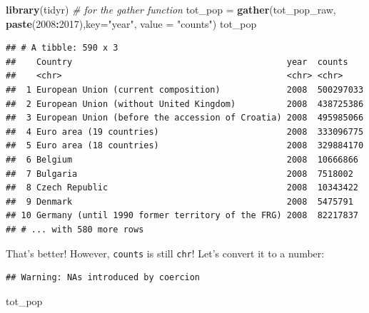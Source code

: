 \documentclass[]{book}
\newenvironment{Shaded}{\begin{snugshade}}{\end{snugshade}}
\newcommand{\KeywordTok}[1]{\textcolor[rgb]{0.13,0.29,0.53}{\textbf{#1}}}
\newcommand{\DataTypeTok}[1]{\textcolor[rgb]{0.13,0.29,0.53}{#1}}
\newcommand{\DecValTok}[1]{\textcolor[rgb]{0.00,0.00,0.81}{#1}}
\newcommand{\StringTok}[1]{\textcolor[rgb]{0.31,0.60,0.02}{#1}}
\newcommand{\CommentTok}[1]{\textcolor[rgb]{0.56,0.35,0.01}{\textit{#1}}}
\newcommand{\OperatorTok}[1]{\textcolor[rgb]{0.81,0.36,0.00}{\textbf{#1}}}
\newcommand{\NormalTok}[1]{#1}
\theoremstyle{definition}
\theoremstyle{definition}
\theoremstyle{definition}
\theoremstyle{remark}
\begin{document}
\begin{Shaded}
\begin{Highlighting}[]
\KeywordTok{library}\NormalTok{(tidyr)   }\CommentTok{# for the gather function}
\NormalTok{tot_pop =}\StringTok{ }\KeywordTok{gather}\NormalTok{(tot_pop_raw, }\KeywordTok{paste}\NormalTok{(}\DecValTok{2008}\OperatorTok{:}\DecValTok{2017}\NormalTok{),}\DataTypeTok{key=}\StringTok{"year"}\NormalTok{, }\DataTypeTok{value =} \StringTok{"counts"}\NormalTok{)}
\NormalTok{tot_pop}
\end{Highlighting}
\end{Shaded}

\begin{verbatim}
## # A tibble: 590 x 3
##    Country                                          year  counts   
##    <chr>                                            <chr> <chr>    
##  1 European Union (current composition)             2008  500297033
##  2 European Union (without United Kingdom)          2008  438725386
##  3 European Union (before the accession of Croatia) 2008  495985066
##  4 Euro area (19 countries)                         2008  333096775
##  5 Euro area (18 countries)                         2008  329884170
##  6 Belgium                                          2008  10666866 
##  7 Bulgaria                                         2008  7518002  
##  8 Czech Republic                                   2008  10343422 
##  9 Denmark                                          2008  5475791  
## 10 Germany (until 1990 former territory of the FRG) 2008  82217837 
## # ... with 580 more rows
\end{verbatim}

That's better! However, \texttt{counts} is still \texttt{chr}! Let's
convert it to a number:

\begin{Shaded}
\end{Shaded}

\begin{verbatim}
## Warning: NAs introduced by coercion
\end{verbatim}

\begin{Shaded}
\begin{Highlighting}[]
\NormalTok{tot_pop}
\end{Highlighting}
\end{Shaded}
\end{document}
